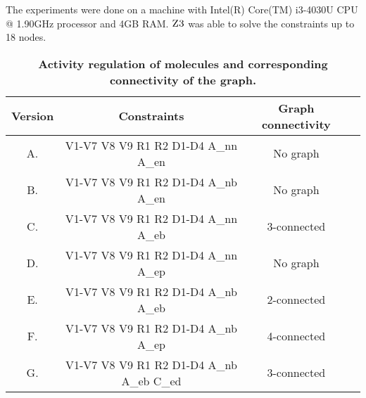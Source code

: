 The experiments were done on a machine with Intel(R) Core(TM) i3-4030U CPU @ 1.90GHz processor 
and 4GB RAM.
%
$\textsc{Z3}$ was able to solve the constraints up to 18 nodes.
%


\begin{table}[!ht]
\centering
\def\arraystretch{1.6}
\caption{
{\bf Activity regulation of molecules and corresponding connectivity of the graph.}}
  \begin{tabular}{|c|c|c|c|}
    \hline
  {\textbf{Version}}  & {\textbf{Constraints}} &  {\textbf{Graph connectivity}}  \\
    \hline
    
    A. & V1-V7 V8 V9 R1 R2 D1-D4 A\_nn A\_en & No graph  \\ \hline
B. & V1-V7 V8 V9 R1 R2 D1-D4 A\_nb A\_en & No graph  \\ \hline
C. & V1-V7 V8 V9 R1 R2 D1-D4 A\_nn A\_eb & 3-connected  \\  \hline
D. & V1-V7 V8 V9 R1 R2 D1-D4 A\_nn A\_ep & No graph  \\ \hline
E. & V1-V7 V8 V9 R1 R2 D1-D4 A\_nb A\_eb & 2-connected  \\ \hline
F. & V1-V7 V8 V9 R1 R2 D1-D4 A\_nb A\_ep & 4-connected  \\ \hline
G. & V1-V7 V8 V9 R1 R2 D1-D4 A\_nb A\_eb C\_ed & 3-connected \\ \hline


  \end{tabular}
\label{table1}
\end{table}




